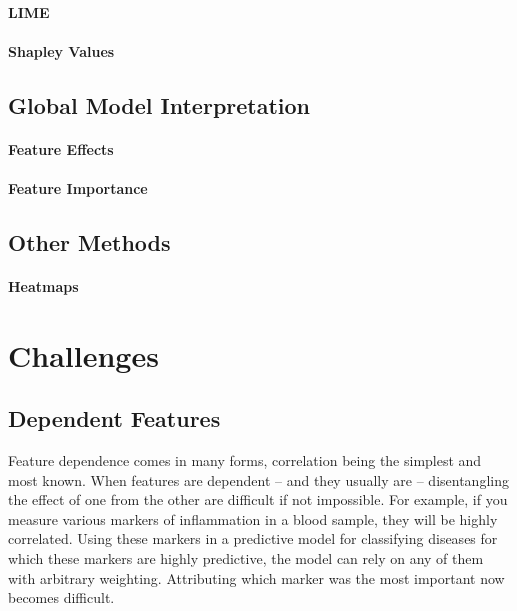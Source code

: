 \documentclass[runningheads]{llncs}
\begin{document}
\paragraph{LIME}

\paragraph{Shapley Values}


\subsection{Global Model Interpretation}

\paragraph{Feature Effects}

\paragraph{Feature Importance}


\subsection{Other Methods}

\paragraph{Heatmaps}

\section{Challenges}

\subsection{Dependent Features}
Feature dependence comes in many forms, correlation being the simplest and most known.
When features are dependent -- and they usually are -- disentangling the effect of one from the other are difficult if not impossible.
For example, if you measure various markers of inflammation in a blood sample, they will be highly correlated.
Using these markers in a predictive model for classifying diseases for which these markers are highly predictive, the model can rely on any of them with arbitrary weighting.
Attributing which marker was the most important now becomes difficult.
\end{document}
